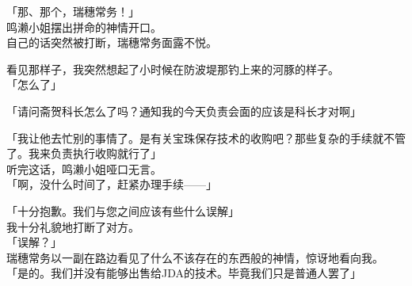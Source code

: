 「那、那个，瑞穗常务！」\\

鸣濑小姐摆出拼命的神情开口。\\

自己的话突然被打断，瑞穗常务面露不悦。

看见那样子，我突然想起了小时候在防波堤那钓上来的河豚的样子。\\

「怎么了」

「请问斋贺科长怎么了吗？通知我的今天负责会面的应该是科长才对啊」

「我让他去忙别的事情了。是有关宝珠保存技术的收购吧？那些复杂的手续就不管了。我来负责执行收购就行了」\\

听完这话，鸣濑小姐哑口无言。\\

「啊，没什么时间了，赶紧办理手续——」

「十分抱歉。我们与您之间应该有些什么误解」\\

我十分礼貌地打断了对方。\\

「误解？」\\

瑞穗常务以一副在路边看见了什么不该存在的东西般的神情，惊讶地看向我。\\

「是的。我们并没有能够出售给JDA的技术。毕竟我们只是普通人罢了」


